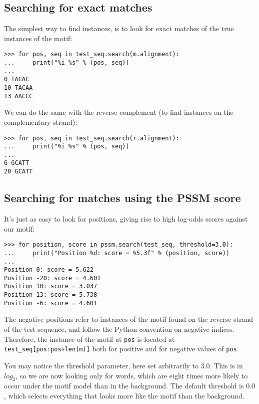 \subsection{Searching for exact matches}

The simplest way to find instances, is to look for exact matches of
the true instances of the motif:

\begin{verbatim}
>>> for pos, seq in test_seq.search(m.alignment):
...     print("%i %s" % (pos, seq))
...
0 TACAC
10 TACAA
13 AACCC
\end{verbatim}
We can do the same with the reverse complement (to find instances on the complementary strand):

\begin{verbatim}
>>> for pos, seq in test_seq.search(r.alignment):
...     print("%i %s" % (pos, seq))
...
6 GCATT
20 GCATT
\end{verbatim}

\subsection{Searching for matches using the PSSM score}

It's just as easy to look for positions, giving rise to high log-odds scores against our motif:

\begin{verbatim}
>>> for position, score in pssm.search(test_seq, threshold=3.0):
...     print("Position %d: score = %5.3f" % (position, score))
...
Position 0: score = 5.622
Position -20: score = 4.601
Position 10: score = 3.037
Position 13: score = 5.738
Position -6: score = 4.601
\end{verbatim}
The negative positions refer to instances of the motif found on the
reverse strand of the test sequence, and follow the Python convention
on negative indices. Therefore, the instance of the motif at \verb|pos|
is located at \verb|test_seq[pos:pos+len(m)]| both for positive and for
negative values of \verb|pos|.

You may notice the threshold parameter, here set arbitrarily to
$3.0$. This is in $log_2$, so we are now looking only for words, which
are eight times more likely to occur under the motif model than in the
background. The default threshold is $0.0$, which selects everything
that looks more like the motif than the background.

